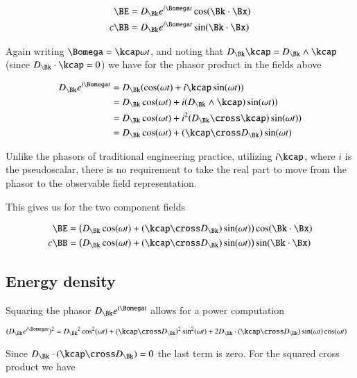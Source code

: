 \begin{align*}
\BE &= D_\Bk e^{i\Bomega t} \cos(\Bk \cdot \Bx) \\
c\BB &= D_\Bk e^{i\Bomega t} \sin(\Bk \cdot \Bx)
\end{align*}

Again writing $\Bomega = \kcap \omega t$, and noting that $D_\Bk \kcap = D_\Bk \wedge \kcap$ (since $D_\Bk \cdot \kcap = 0$) we have for the phasor product in the fields above

\begin{align*}
D_\Bk e^{i\Bomega t} 
&=
D_\Bk (\cos(\omega t) + i\kcap \sin(\omega t)) \\
&=
D_\Bk \cos(\omega t) + i (D_\Bk \wedge \kcap) \sin(\omega t)) \\
&=
D_\Bk \cos(\omega t) + i^2 (D_\Bk \cross \kcap) \sin(\omega t)) \\
&=
D_\Bk \cos(\omega t) + (\kcap \cross D_\Bk) \sin(\omega t) \\
\end{align*}

Unlike the phasors of traditional engineering practice, utilizing $i\kcap$, where $i$ is the pseudoscalar, there is no requirement to take the real part to move from the phasor to the observable field representation.  

This gives us for the two component fields

\begin{align}\label{eqn:splitFields}
\BE &= \left( D_\Bk \cos(\omega t) + (\kcap \cross D_\Bk) \sin(\omega t) \right) \cos(\Bk \cdot \Bx) \\
c \BB &= \left( D_\Bk \cos(\omega t) + (\kcap \cross D_\Bk) \sin(\omega t) \right) \sin(\Bk \cdot \Bx)
\end{align}

\subsection{Energy density}

Squaring the phasor $D_\Bk e^{i\Bomega t}$ allows for a power computation

\begin{align*}
(D_\Bk e^{i\Bomega t} )^2
&=
{D_\Bk}^2 \cos^2(\omega t) + (\kcap \cross D_\Bk)^2 \sin^2(\omega t) + 2 D_\Bk \cdot (\kcap \cross D_\Bk) \sin(\omega t) \cos(\omega t)
\end{align*}

Since $D_\Bk \cdot (\kcap \cross D_\Bk) = 0$ the last term is zero.  For the squared cross product we have

